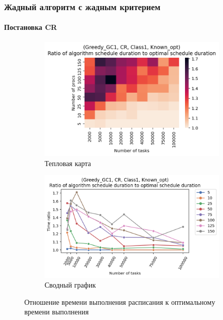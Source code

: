 \subsubsection{Жадный алгоритм с жадным критерием}

\paragraph{Постановка CR}

\begin{figure}[!htbp]
    \centering
    \begin{subfigure}{0.49\textwidth}
        \includegraphics[width=\textwidth]{imgs/ideal_1/CR/th.png}
        \caption{Тепловая карта}
        \label{fig:CR-GC1-times-heatmap}
    \end{subfigure}
    \hfill
    \begin{subfigure}{0.49\textwidth}
        \includegraphics[width=\textwidth]{imgs/ideal_1/CR/gr_amalgamated.png}
        \caption{Сводный график}   
        \label{fig:CR-GC1-times-compiled} 
    \end{subfigure}
    \caption{Отношение времени выполнения расписания к оптимальному времени выполнения}
\end{figure}

